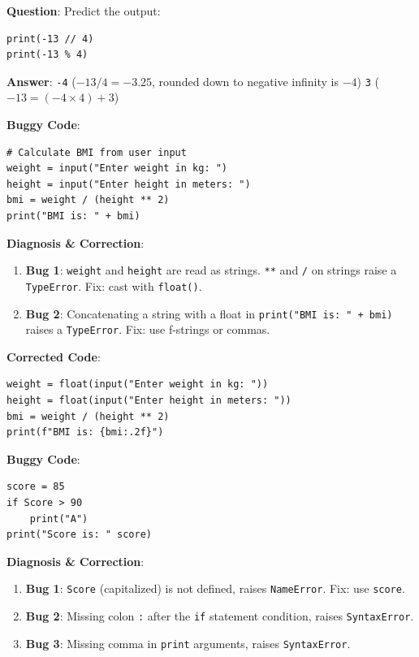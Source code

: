 \begin{outputprediction}
\textbf{Question}: Predict the output:
\begin{lstlisting}[language=Python3]
print(-13 // 4)
print(-13 % 4)
\end{lstlisting}
\textbf{Answer}:
\texttt{-4} ($-13/4 = -3.25$, rounded down to negative infinity is $-4$)
\texttt{3} ($-13 = (-4 \times 4) + 3$)
\end{outputprediction}

\begin{debuggingbox}
\textbf{Buggy Code}:
\begin{lstlisting}[language=Python3]
# Calculate BMI from user input
weight = input("Enter weight in kg: ")
height = input("Enter height in meters: ")
bmi = weight / (height ** 2)
print("BMI is: " + bmi)
\end{lstlisting}
\textbf{Diagnosis \& Correction}:
\begin{enumerate}
    \item \textbf{Bug 1}: \texttt{weight} and \texttt{height} are read as strings. \texttt{**} and \texttt{/} on strings raise a \texttt{TypeError}. Fix: cast with \texttt{float()}.
    \item \textbf{Bug 2}: Concatenating a string with a float in \texttt{print("BMI is: " + bmi)} raises a \texttt{TypeError}. Fix: use f-strings or commas.
\end{enumerate}
\textbf{Corrected Code}:
\begin{lstlisting}[language=Python3]
weight = float(input("Enter weight in kg: "))
height = float(input("Enter height in meters: "))
bmi = weight / (height ** 2)
print(f"BMI is: {bmi:.2f}")
\end{lstlisting}
\end{debuggingbox}

\begin{debuggingbox}
\textbf{Buggy Code}:
\begin{lstlisting}[language=Python3]
score = 85
if Score > 90
    print("A")
print("Score is: " score)
\end{lstlisting}
\textbf{Diagnosis \& Correction}:
\begin{enumerate}
    \item \textbf{Bug 1}: \texttt{Score} (capitalized) is not defined, raises \texttt{NameError}. Fix: use \texttt{score}.
    \item \textbf{Bug 2}: Missing colon \texttt{:} after the \texttt{if} statement condition, raises \texttt{SyntaxError}.
    \item \textbf{Bug 3}: Missing comma in \texttt{print} arguments, raises \texttt{SyntaxError}.
\end{enumerate}
\end{debuggingbox}

